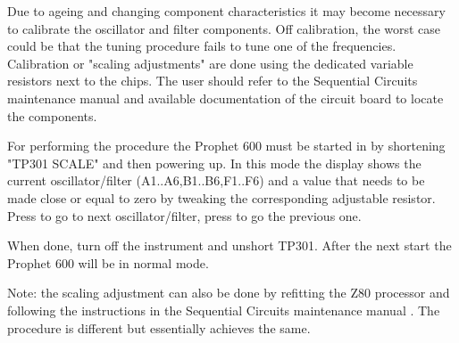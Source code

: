Due to ageing and changing component characteristics it may become necessary to calibrate the oscillator and filter components. Off calibration, the worst case could be that the tuning procedure fails to tune one of the frequencies. Calibration or "scaling adjustments" are done using the dedicated variable resistors next to the chips. The user should refer to the Sequential Circuits maintenance manual \cite{p600siservicemanual} and available documentation of the circuit board to locate the components. 

For performing the procedure the Prophet 600 must be started in \maintenance by shortening "TP301 SCALE" and then powering up. In this mode the display shows the current oscillator/filter (A1..A6,B1..B6,F1..F6) and a value that needs to be made close or equal to zero by tweaking the corresponding adjustable resistor. Press  to go to next oscillator/filter, press  to go the previous one.

When done, turn off the instrument and unshort TP301. After the next start the Prophet 600 will be in normal mode.

Note: the scaling adjustment can also be done by refitting the Z80 processor and following the instructions in the Sequential Circuits maintenance manual \cite{p600siservicemanual}. The procedure is different but essentially achieves the same.
